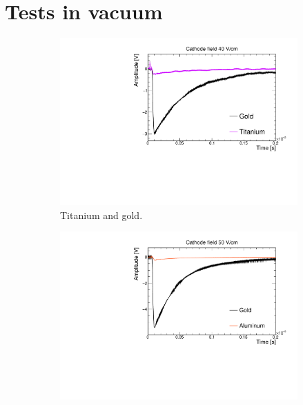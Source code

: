 \documentclass[a4paper,11pt]{article}
\begin{document}
\section{Tests in vacuum}
\label{sec:tests_vacuum}
\begin{figure}[tb]
    \begin{subfigure}[h]{0.49\textwidth}\centering\captionsetup{singlelinecheck = false, format= hang, justification=raggedright, font=footnotesize, labelsep=space}
            \includegraphics[width=.99\linewidth]{figures/TitaniumVSGold_40Vcm.pdf}
        \caption{Titanium and gold.}
        \label{fig:titanium}
    \end{subfigure}
    \hfill
    \begin{subfigure}[h]{0.49\textwidth}\centering\centering\captionsetup{singlelinecheck = false, format= hang, justification=raggedright, font=footnotesize, labelsep=space}
            \includegraphics[width=.99\linewidth]{figures/AluminumVSGold_50Vcm.pdf}

\end{subfigure}
\end{figure}
\end{document}

